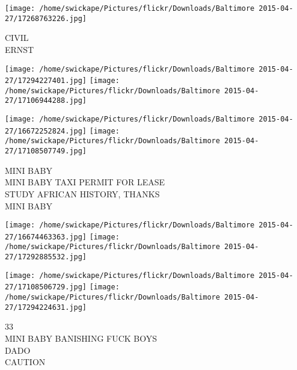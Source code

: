 \documentclass[10pt,letterpaper]{article}
\begin{document}
\vspace{0.25in}
\texttt{[image: /home/swickape/Pictures/flickr/Downloads/Baltimore 2015-04-27/17268763226.jpg]}

CIVIL\\
ERNST
\pagebreak

\texttt{[image: /home/swickape/Pictures/flickr/Downloads/Baltimore 2015-04-27/17294227401.jpg]}
\texttt{[image: /home/swickape/Pictures/flickr/Downloads/Baltimore 2015-04-27/17106944288.jpg]}

\texttt{[image: /home/swickape/Pictures/flickr/Downloads/Baltimore 2015-04-27/16672252824.jpg]}
\texttt{[image: /home/swickape/Pictures/flickr/Downloads/Baltimore 2015-04-27/17108507749.jpg]}

MINI BABY\\
MINI BABY TAXI PERMIT FOR LEASE\\
STUDY AFRICAN HISTORY, THANKS\\
MINI BABY
\pagebreak

\texttt{[image: /home/swickape/Pictures/flickr/Downloads/Baltimore 2015-04-27/16674463363.jpg]}
\texttt{[image: /home/swickape/Pictures/flickr/Downloads/Baltimore 2015-04-27/17292885532.jpg]}

\texttt{[image: /home/swickape/Pictures/flickr/Downloads/Baltimore 2015-04-27/17108506729.jpg]}
\texttt{[image: /home/swickape/Pictures/flickr/Downloads/Baltimore 2015-04-27/17294224631.jpg]}

33\\
MINI BABY BANISHING FUCK BOYS\\
DADO\\
CAUTION
\pagebreak
\end{document}
